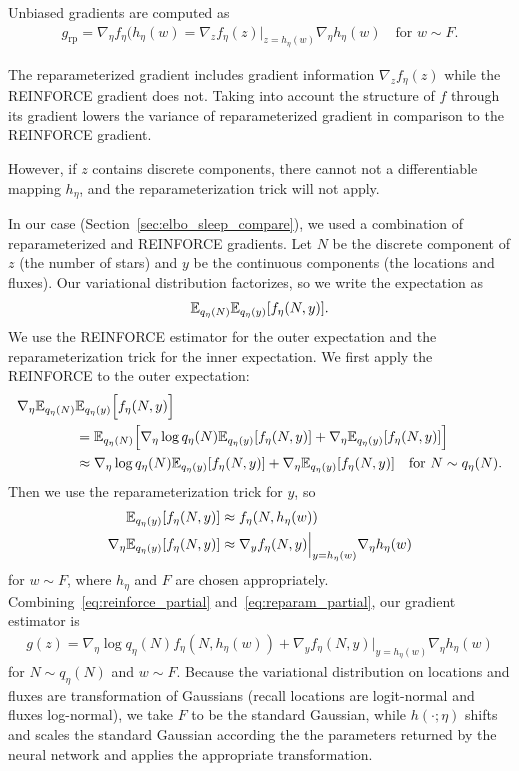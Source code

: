 Unbiased gradients are computed as 
\begin{align}
    g_{\textrm{rp}} 
    = \nabla_\eta f_\eta(h_\eta(w)
    = \nabla_z f_\eta(z)\Big|_{z = h_\eta(w)}
    \nabla_\eta h_\eta(w) \quad \text{for } w\sim F. 
\end{align}

The reparameterized gradient includes gradient information $\nabla_z f_\eta(z)$ while the REINFORCE gradient does not. Taking into account the structure of $f$ through its gradient lowers the variance of reparameterized gradient in comparison to the REINFORCE gradient. 

However, if $z$ contains discrete components, there cannot not a differentiable mapping $h_\eta$, and the reparameterization trick will not apply. 

In our case (Section~\ref{sec:elbo_sleep_compare}), we used a combination of reparameterized and REINFORCE gradients. Let $N$ be the discrete component of $z$ (the number of stars) and $y$ be the continuous components (the locations and fluxes). Our variational distribution factorizes, so we write the expectation as 
\begin{align}
 \mathbb{E}_{q_\eta(N)}\mathbb{E}_{q_\eta(y)}[f_\eta(N, y)]. 
\end{align}
We use the REINFORCE estimator for the outer expectation and the reparameterization trick for the inner expectation. We first apply the REINFORCE to the outer expectation: 
\begin{align}
    \nabla_\eta  \mathbb{E}_{q_\eta(N)}&\mathbb{E}_{q_\eta(y)}\Big[f_\eta(N, y)\Big] \\
    &=  \mathbb{E}_{q_\eta(N)}\Big[ \nabla_\eta \log q_\eta(N) \mathbb{E}_{q_\eta(y)}[f_\eta(N, y)] + 
    \nabla_\eta \mathbb{E}_{q_\eta(y)}[f_\eta(N, y)] \Big]\\
    &\approx \nabla_\eta \log q_\eta(N) \mathbb{E}_{q_\eta(y)}[f_\eta(N, y)] + 
    \nabla_\eta \mathbb{E}_{q_\eta(y)}[f_\eta(N, y)] \quad \text{for } N \sim q_\eta(N). 
    \label{eq:reinforce_partial}
\end{align}
Then we use the reparameterization trick for $y$, so 
\begin{align}
    \mathbb{E}_{q_\eta(y)}[f_\eta(N, y)] &\approx f_\eta(N, h_\eta(w))\\
    \nabla_\eta \mathbb{E}_{q_\eta(y)}[f_\eta(N, y)] &\approx  \nabla_y f_\eta(N, y)\Big|_{y = h_\eta(w)}
    \nabla_\eta h_\eta(w) 
    \label{eq:reparam_partial}
\end{align}
for $w \sim F$, where $h_\eta$ and $F$ are chosen appropriately. Combining~\eqref{eq:reinforce_partial} and~\eqref{eq:reparam_partial}, our gradient estimator is 
\begin{align}
    g(z) = \nabla_\eta \log q_\eta(N) 
    f_\eta(N, h_\eta(w)) + 
    \nabla_y f_\eta(N, y)\Big|_{y = h_\eta(w)}
    \nabla_\eta h_\eta(w) 
\end{align}
for $N\sim q_\eta(N)$ and $w\sim F$. Because the variational distribution on locations and fluxes are transformation of Gaussians (recall locations are logit-normal and fluxes log-normal), we take $F$ to be the standard Gaussian, while $h(\cdot ; \eta)$ shifts and scales the standard Gaussian according the the parameters returned by the neural network and applies the appropriate transformation. 
